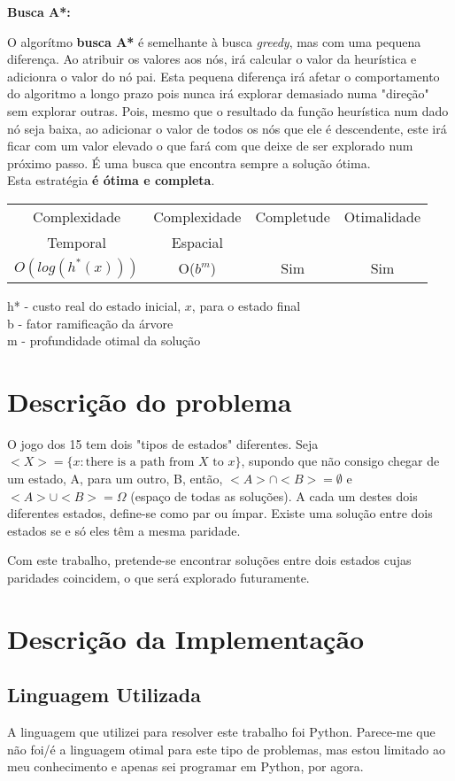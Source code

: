 \documentclass{article}
\begin{document}
\textbf{Busca A*:}\par
O algorítmo \textbf{busca A*} é semelhante à busca \textit{greedy}, mas com uma pequena diferença. Ao atribuir os valores aos nós, irá calcular o valor da heurística e adicionra o valor do nó pai. Esta pequena diferença irá afetar o comportamento do algoritmo a longo prazo pois nunca irá explorar demasiado numa "direção" sem explorar outras. Pois, mesmo que o resultado da função heurística num dado nó seja baixa, ao adicionar o valor de todos os nós que ele é descendente, este irá ficar com um valor elevado o que fará com que deixe de ser explorado num próximo passo. É uma busca que encontra sempre a solução ótima.\\
Esta estratégia \textbf{é ótima e completa}.
\begin{center}
\begin{tabular}{|c|c|c|c|}
  \hline
  Complexidade & Complexidade & Completude & Otimalidade\\
  Temporal & Espacial & & \\
  \hline
  $O(log(h^{*}(x)))$ & O($b^m$) & Sim & Sim\\
  \hline
\end{tabular}
\end{center}
h* - custo real do estado inicial, $x$, para o estado final\\
b - fator ramificação da árvore\\
m - profundidade otimal da solução
\section{Descrição do problema}
\hspace{10mm}O jogo dos 15 tem dois "tipos de estados" diferentes. Seja $<X>=\{x : \text{there is a path from } X \text{ to } x\}$, supondo que não consigo chegar de um estado, A, para um outro, B, então, $<A>\cap<B>=\emptyset$ e $<A>\cup<B>=\Omega$ (espaço de todas as soluções). A cada um destes dois diferentes estados, define-se como par ou ímpar. Existe uma solução entre dois estados se e só eles têm a mesma paridade.\par
Com este trabalho, pretende-se encontrar soluções entre dois estados cujas paridades coincidem, o que será explorado futuramente.
\section{Descrição da Implementação}
\subsection{Linguagem Utilizada}
\hspace{8mm}A linguagem que utilizei para resolver este trabalho foi Python. Parece-me que não foi/é a linguagem otimal para este tipo de problemas, mas estou limitado ao meu conhecimento e apenas sei programar em Python, por agora.
\end{document}
